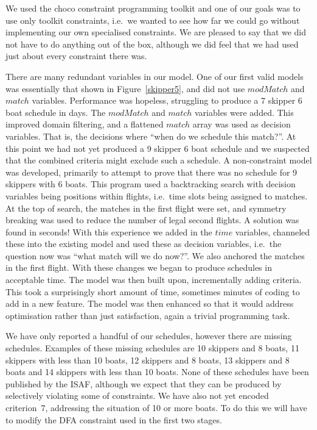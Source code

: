 \documentclass{llncs}
\newcommand{\match}{\mathit{match}}
\newcommand{\modMatch}{\mathit{modMatch}}
\newcommand{\timeVar}{\mathit{time}}
\begin{document}
We used the choco constraint programming toolkit and one of our goals was to use only toolkit
constraints, i.e.\ we wanted to see how far we could go without implementing our own specialised
constraints. We are pleased to say that we did not have to do anything out of the box, although we
did feel that we had used just about every constraint there was.

There are many redundant variables in our model. One of our first valid models was essentially that
shown in Figure~\ref{skipper5}, and did not use $\modMatch$ and $\match$ variables. Performance was
hopeless, struggling to produce a 7 skipper 6 boat schedule in days. The $\modMatch$ and $\match$
variables were added. This improved domain filtering, and a flattened $\match$ array was used as
decision variables. That is, the decisions where ``when do we schedule this match?''.  At this point
we had not yet produced a 9 skipper 6 boat schedule and we suspected that the combined criteria
might exclude such a schedule. A non-constraint model was developed, primarily
to attempt to prove that there was no schedule for 9 skippers with 6 boats. This program used a
backtracking search with decision variables being positions within flights, i.e.\ time slots being
assigned to matches. At the top of search, the matches in the first flight were set, and symmetry
breaking was used to reduce the number of legal second flights. A solution was found in seconds!
With this experience we added in the $\timeVar$ variables, channeled these into the existing model
and used these as decision variables, i.e.\ the question now was ``what match will we do now?''. We
also anchored the matches in the first flight. With these changes we began to produce schedules in
acceptable time. The model was then built upon, incrementally adding criteria. This took a
surprisingly short amount of time, sometimes minutes of coding to add in a new feature. The model
was then enhanced so that it would address optimisation rather than just satisfaction, again a
trivial programming task.

We have only reported a handful of our schedules, however there are missing schedules. Examples of
these missing schedules are 10 skippers and 8 boats, 11 skippers with less than 10 boats, 12
skippers and 8 boats, 13 skippers and 8 boats and 14 skippers with less than 10 boats. None of these
schedules have been published by the ISAF, although we expect that they can be produced by
selectively violating some of constraints. We have also not yet encoded criterion~7, addressing the
situation of 10 or more boats. To do this we will have to modify the DFA constraint used in the
first two stages.
\end{document}
